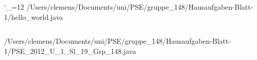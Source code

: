 \begingroup
\catcode`\_=12\relax
/Users/clemens/Documents/uni/PSE/gruppe_148/Hausaufgaben-Blatt-1/hello_world.java
\inputminted{java}{/Users/clemens/Documents/uni/PSE/gruppe_148/Hausaufgaben-Blatt-1/hello_world.java}
/Users/clemens/Documents/uni/PSE/gruppe_148/Hausaufgaben-Blatt-1/PSE_2012_U_1_Sl_19_Grp_148.java
\inputminted{java}{/Users/clemens/Documents/uni/PSE/gruppe_148/Hausaufgaben-Blatt-1/PSE_2012_U_1_Sl_19_Grp_148.java}
\endgroup
